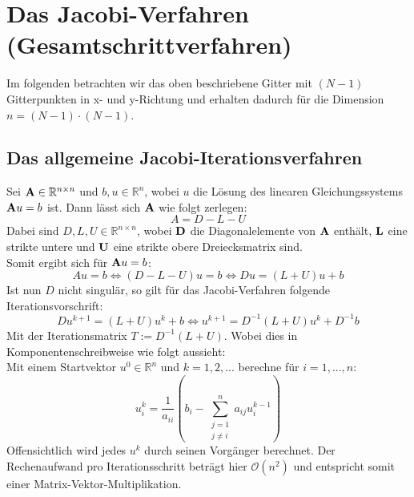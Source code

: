 \section{Das Jacobi-Verfahren (Gesamtschrittverfahren)}\label{s.Das Jacobi-Iterationsverfahren}

Im folgenden betrachten wir das oben beschriebene Gitter mit $(N-1)$ Gitterpunkten in x- und y-Richtung und erhalten dadurch für die Dimension $n = (N-1) \cdot (N-1)$. \\


\subsection{Das allgemeine Jacobi-Iterationsverfahren}
Sei ${\textbf{A}} \in \mathbb{R}^{n \times n}$ und $b,u \in \mathbb{R}^{n}$, wobei $u$ die Lösung des linearen Gleichungssystems ${\textbf{A}}u = b$ ist. Dann lässt sich ${\textbf{A}}$ wie folgt zerlegen:
\begin{equation}
A = D - L - U
\end{equation}
Dabei sind $D,L,U \in \mathbb{R}^{n \times n}$, wobei ${\textbf{D}}$ die Diagonalelemente von ${\textbf{A}}$ enthält, ${\textbf{L}}$ eine strikte untere und ${\textbf{U}}$ eine strikte obere Dreiecksmatrix sind. \\
Somit ergibt sich für ${\textbf{A}}u = b$:
\begin{equation}
Au = b \Leftrightarrow (D-L-U)u = b \Leftrightarrow Du = (L+U)u + b
\end{equation}
Ist nun $D$ nicht singulär, so gilt für das Jacobi-Verfahren folgende Iterationsvorschrift:
\begin{equation}
Du^{k+1} = (L+U)u^{k} + b \Leftrightarrow u^{k+1} = D^{-1}(L+U)u^{k} + D^{-1}b
\end{equation}
Mit der Iterationsmatrix $T := D^{-1}(L+U)$.
Wobei dies in Komponentenschreibweise wie folgt aussieht: \\
Mit einem Startvektor $u^{0} \in \mathbb{R}^{n}$ und $k=1,2,...$ berechne für $i=1,...,n$:
\begin{equation}
u^{k}_{i} = \frac {1} {a_{ii}} (b_{i} - \sum_{\substack{j = 1 \\ j \ne i}}^{n} a_{ij}u^{k-1}_{i})
\end{equation}
Offensichtlich wird jedes $u^{k}$ durch seinen Vorgänger berechnet. Der Rechenaufwand pro Iterationsschritt beträgt hier $\mathcal{O}(n^{2})$ und entspricht somit einer Matrix-Vektor-Multiplikation.

